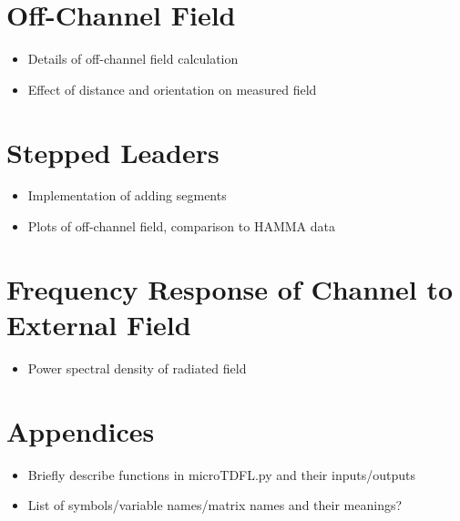 \documentclass{article}
\begin{document}
\section{Off-Channel Field}
\begin{itemize}
\item Details of off-channel field calculation
\item Effect of distance and orientation on measured field
\end{itemize}

\section{Stepped Leaders}
\begin{itemize}
\item Implementation of adding segments
\item Plots of off-channel field, comparison to HAMMA data
\end{itemize}

\section{Frequency Response of Channel to External Field}
\begin{itemize}
\item Power spectral density of radiated field
\end{itemize}

\section*{Appendices}
\begin{itemize}
\item Briefly describe functions in microTDFL.py and their inputs/outputs
\item List of symbols/variable names/matrix names and their meanings?
\end{itemize}


\end{document}

